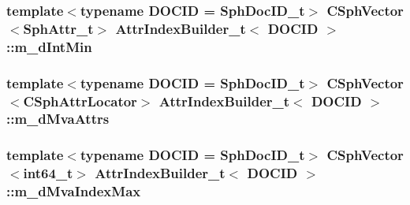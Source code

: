 \hypertarget{classAttrIndexBuilder__t_a67e4137dd4df1d5b23aaaaa42abd87ac}{
\subsubsection[{m\-\_\-d\-Int\-Min}]{\setlength{\rightskip}{0pt plus 5cm}template$<$typename D\-O\-C\-I\-D  = Sph\-Doc\-I\-D\-\_\-t$>$ {\bf C\-Sph\-Vector}$<${\bf Sph\-Attr\-\_\-t}$>$ {\bf Attr\-Index\-Builder\-\_\-t}$<$ D\-O\-C\-I\-D $>$\-::m\-\_\-d\-Int\-Min\hspace{0.3cm}{\ttfamily [private]}}}\label{classAttrIndexBuilder__t_a67e4137dd4df1d5b23aaaaa42abd87ac}
\hypertarget{classAttrIndexBuilder__t_a93044612daa6c5014232d65ac244b929}{
\subsubsection[{m\-\_\-d\-Mva\-Attrs}]{\setlength{\rightskip}{0pt plus 5cm}template$<$typename D\-O\-C\-I\-D  = Sph\-Doc\-I\-D\-\_\-t$>$ {\bf C\-Sph\-Vector}$<${\bf C\-Sph\-Attr\-Locator}$>$ {\bf Attr\-Index\-Builder\-\_\-t}$<$ D\-O\-C\-I\-D $>$\-::m\-\_\-d\-Mva\-Attrs\hspace{0.3cm}{\ttfamily [private]}}}\label{classAttrIndexBuilder__t_a93044612daa6c5014232d65ac244b929}
\hypertarget{classAttrIndexBuilder__t_a4343408a218405a1c9e07f707a928090}{
\subsubsection[{m\-\_\-d\-Mva\-Index\-Max}]{\setlength{\rightskip}{0pt plus 5cm}template$<$typename D\-O\-C\-I\-D  = Sph\-Doc\-I\-D\-\_\-t$>$ {\bf C\-Sph\-Vector}$<${\bf int64\-\_\-t}$>$ {\bf Attr\-Index\-Builder\-\_\-t}$<$ D\-O\-C\-I\-D $>$\-::m\-\_\-d\-Mva\-Index\-Max\hspace{0.3cm}{\ttfamily [private]}}}\label{classAttrIndexBuilder__t_a4343408a218405a1c9e07f707a928090}
